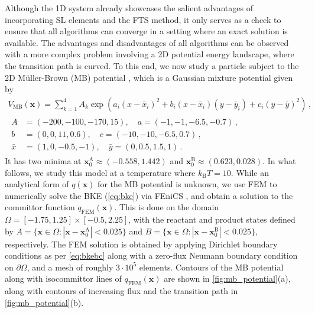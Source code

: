 \documentclass{article}
\numberwithin{equation}{section}
\def\*#1{\mathbf{#1}}
\theoremstyle{definition}
\theoremstyle{remark}
\begin{document}
Although the 1D system already showcases the salient advantages of incorporating SL elements and the FTS method, it only serves as a check to ensure that all algorithms can converge in a setting where an exact solution is available. The advantages and disadvantages of all algorithms can be observed with a more complex problem involving a 2D potential energy landscape, where the transition path is curved. To this end, we now study a particle subject to the 2D M{\"u}ller-Brown (MB) potential \cite{muller1979location}, which is a Gaussian mixture potential given by
\begin{gather}
 \label{eq:v_mb}
 V_{\mathrm{MB}}(\* x) = \sum_{k=1}^4 A_k \exp \left( a_{i} \left( x - \bar{x}_{i} \right)^{2} + b_{i} \left( x - \bar{x}_{i} \right) \left( y - \bar{y}_{i} \right) + c_{i} \left( y - \bar{y} \right)^{2} \right) \,,
 \\
 \begin{aligned}
     A &= (-200,-100,-170,15), \quad  a = (-1, -1, -6.5, -0.7) \,, \\
     b &= (0,0,11,0.6), \quad  c = (-10, -10, -6.5, 0.7) \,, \\
     \bar{x} &= (1, 0, -0.5, -1), \quad  \bar{y} = (0, 0.5, 1.5, 1) \,.
 \end{aligned} \nonumber
\end{gather}
It has two minima at $ \* x_{0}^\mathrm{A} \approx (-0.558, 1.442) $ and $ \* x_{0}^\mathrm{B} \approx (0.623, 0.028) $. In what follows, we study this model at a temperature where $ k_{\mathrm{B}} T = 10 $.
While an analytical form of $ q ( \* x ) $ for the MB potential is unknown, we use FEM to numerically solve the BKE (\cref{eq:bke}) via FEniCS \cite{logg2012automated,alnaes2015fenics}, and obtain a solution to the committor function $ q_{\mathrm{FEM}}(\* x) $.
This is done on the domain $ \Omega = \left[ -1.75 , 1.25 \right] \times \left[ -0.5, 2.25 \right] $, with the reactant and product states defined by $ A = \lbrace \* x \in \Omega : | \* x - \* x_{0}^\mathrm{A} | < 0.025 \rbrace $ and $ B = \lbrace \* x \in \Omega : | \* x - \* x_{0}^\mathrm{B} | < 0.025 \rbrace $, respectively.
The FEM solution is obtained by applying Dirichlet boundary conditions as per \cref{eq:bkebc} along with a zero-flux Neumann boundary condition on $ \partial \Omega $, and a mesh of roughly $3 \cdot 10^5$ elements.
Contours of the MB potential along with isocommittor lines of $ q_{\mathrm{FEM}}( \* x ) $ are shown in \cref{fig:mb_potential}(a), along with contours of increasing flux and the transition path in \cref{fig:mb_potential}(b).
\end{document}
